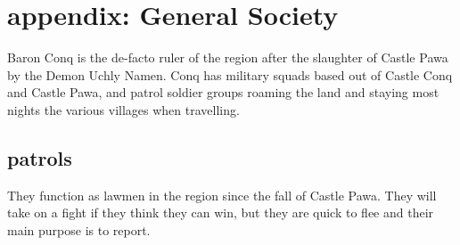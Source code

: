 




























\clearpage
\section*{appendix: General Society}

\raggedbottom

Baron Conq is the de-facto ruler of the region after the slaughter of Castle Pawa by the Demon Uchly Namen. Conq has military squads based out of Castle Conq and Castle Pawa, and patrol soldier groups roaming the land and staying most nights the various villages when travelling.


\subsection*{patrols}

They function as lawmen in the region since the fall of Castle Pawa. They will take on a fight if they think they can win, but they are quick to flee and their main purpose is to report.

